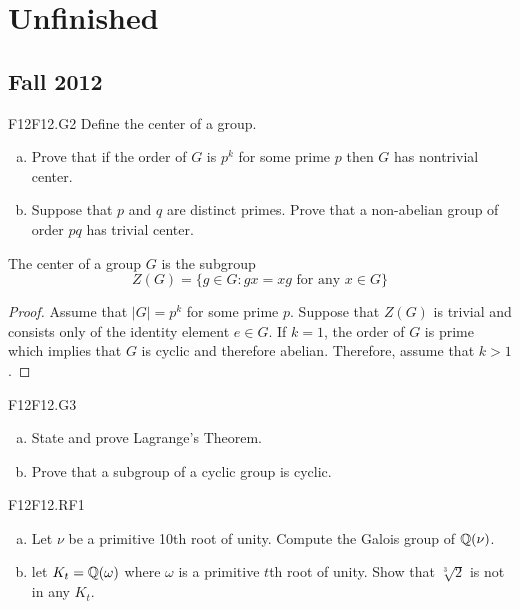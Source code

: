 \documentclass[../AlgebraQualSolutions.tex]{subfiles}
\begin{document}
\section{Unfinished}


	\subsection{Fall 2012}

	\begin{prob}{F12}{F12.G2}
	Define the center of a group.
	\begin{enumerate}[(a)]
	\item Prove that if the order of $G$ is $p^k$ for some prime $p$ then $G$ has nontrivial center.
	\item Suppose that $p$ and $q$ are distinct primes. Prove that a non-abelian group of order $pq$ has trivial center.
	\end{enumerate}
	\end{prob}
	
	The center of a group $G$ is the subgroup
		\[Z(G) = \{g \in G: gx = xg \textrm{ for any $x \in G$} \} \]
	
	\begin{proof}
	Assume that $|G| = p^k$ for some prime $p$. Suppose that $Z(G)$ is trivial and consists only of the identity element $e \in G$. If $k = 1$, the order of $G$ is prime which implies that $G$ is cyclic and therefore abelian. Therefore, assume that $k > 1$.
	\end{proof}
	
	
	\begin{prob}{F12}{F12.G3}
	\begin{enumerate}[(a)]
	\item State and prove Lagrange's Theorem.
	\item Prove that a subgroup of a cyclic group is cyclic.
	\end{enumerate}
	\end{prob}
	
	\begin{prob}{F12}{F12.RF1}
	\begin{enumerate}[(a)]
	\item Let $\nu$ be a primitive 10th root of unity. Compute the Galois group of $\mathbb{Q}(\nu)$.
	\item let $K_t = \mathbb{Q}(\omega)$ where $\omega$ is a primitive $t$th root of unity. Show that $\sqrt[3]{2}$ is not in any $K_t$.
	\end{enumerate}
	\end{prob}
	
\end{document}
